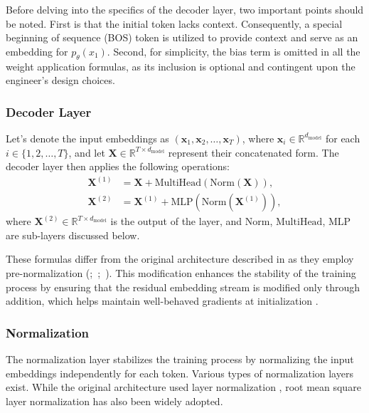 Before delving into the specifics of the decoder layer, two important points should be noted. First is that the initial token lacks context. Consequently, a special beginning of sequence (BOS) token is utilized to provide context and serve as an embedding for \(p_\theta(x_1)\). Second, for simplicity, the bias term is omitted in all the weight application formulas, as its inclusion is optional and contingent upon the engineer's design choices.

\subsubsection*{Decoder Layer}

Let's denote the input embeddings as \((\mathbf{x}_1, \mathbf{x}_2, \ldots, \mathbf{x}_{T})\), where \(\mathbf{x}_i \in \mathbb{R}^{d_{\mathrm{model}}}\) for each \(i \in \{1, 2, \ldots, T\}\), and let \(\mathbf{X} \in \mathbb{R}^{T \times d_{\mathrm{model}}}\) represent their concatenated form. The decoder layer then applies the following operations:
\begin{align}
    \mathbf{X}^{(1)} &= \mathbf{X} + \mathrm{MultiHead}(\mathrm{Norm}(\mathbf{X})), \\
    \mathbf{X}^{(2)} &= \mathbf{X}^{(1)} + \mathrm{MLP}(\mathrm{Norm}(\mathbf{X}^{(1)})),
\end{align}
where \(\mathbf{X}^{(2)} \in \mathbb{R}^{T \times d_{\mathrm{model}}}\) is the output of the layer, and \(\mathrm{Norm}\), \(\mathrm{MultiHead}\), \(\mathrm{MLP}\) are sub-layers discussed below.

These formulas differ from the original architecture described in \citet{vaswani2017} as they employ pre-normalization (\cite{baevski2019};~\cite{child2019};~\cite{wang2019}). This modification enhances the stability of the training process by ensuring that the residual embedding stream is modified only through addition, which helps maintain well-behaved gradients at initialization \parencite{xiong2020}.

\subsubsection*{Normalization}

The normalization layer stabilizes the training process by normalizing the input embeddings independently for each token. Various types of normalization layers exist. While the original architecture used layer normalization \parencite{ba2016}, root mean square layer normalization \parencite{zhang2019} has also been widely adopted.

